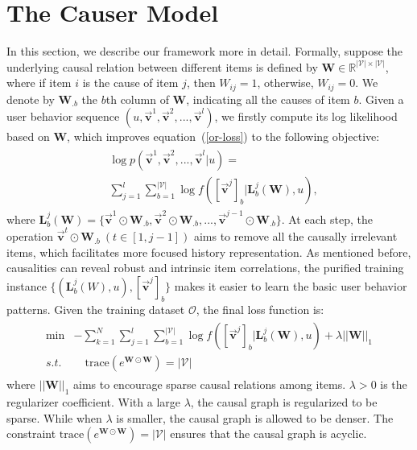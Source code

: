 \documentclass[conference]{IEEEtran}
\theoremstyle{definition}
\theoremstyle{theorem}
\theoremstyle{proof}
\theoremstyle{remark}
\begin{document}
\section{The Causer Model}\label{cau-model}
In this section, we describe our framework more in detail.
Formally, suppose the underlying causal relation between different items is defined by $\bm{W}\in\mathbb{R}^{|\mathcal{V}|\times |\mathcal{V}|}$, where if item $i$ is the cause of item $j$, then $W_{ij}=1$, otherwise, $W_{ij}=0$.
We denote by $\bm{W}_{.b}$ the $b$th column of $\bm{W}$, indicating all the causes of item $b$.
Given a user behavior sequence $(u,\vec{\bm{v}}^1,\vec{\bm{v}}^2,...,\vec{\bm{v}}^{l})$, we firstly compute its log likelihood based on $\bm{W}$, which improves equation~(\ref{or-loss}) to the following objective: 
	\begin{eqnarray}\label{imp-loss}
		\begin{aligned}
			&\log{p(\vec{\bm{v}}^1,\vec{\bm{v}}^2,...,\vec{\bm{v}}^{l}|u)} =\\ &\sum_{j=1}^{l}\sum_{b=1}^{|\mathcal{V}|}{\log{f([\vec{\bm{v}}^{j}]_b|\bm{L}_b^j(\bm{W}), {u})}},
		\end{aligned}
	\end{eqnarray}
where $\bm{L}_b^j(\bm{W}) = \{\vec{\bm{v}}^1\odot\bm{W}_{.b},\vec{\bm{v}}^2\odot\bm{W}_{.b},...,\vec{\bm{v}}^{j-1}\odot\bm{W}_{.b}\}$.
At each step, the operation $\vec{\bm{v}}^t\odot\bm{W}_{.b}~(t\in[1,j-1])$ aims to remove all the causally irrelevant items, which facilitates more focused history representation.
As mentioned before, causalities can reveal robust and intrinsic item correlations, the purified training instance $\{(\bm{L}^j_b(W), {u}),[\vec{\bm{v}}^{j}]_b\}$ makes it easier to learn the basic user behavior patterns.
Given the training dataset $\mathcal{O}$, the final loss function is:
	\begin{eqnarray}\label{ini-loss}
		\begin{aligned}
			\min &-\sum_{k=1}^N \sum_{j=1}^{l}\sum_{b=1}^{|\mathcal{V}|}{ \log{f([\vec{\bm{v}}^{j}]_b|\bm{L}_b^j(\bm{W}), {u})}}+ \lambda||\bm{W}||_{1}\\
			s.t.&\quad \text{trace}(e^{\bm{W}\odot \bm{W}}) = |\mathcal{V}|
		\end{aligned}
	\end{eqnarray}
where $||\bm{W}||_{1}$ aims to encourage sparse causal relations among items.
$\lambda > 0$ is the regularizer coefficient. 
With a large $\lambda$, the causal graph is regularized to be sparse.
While when $\lambda$ is smaller, the causal graph is allowed to be denser.
The constraint $\text{trace}(e^{\bm{W}\odot \bm{W}}) = |\mathcal{V}|$ ensures that the causal graph is acyclic.
\end{document}
